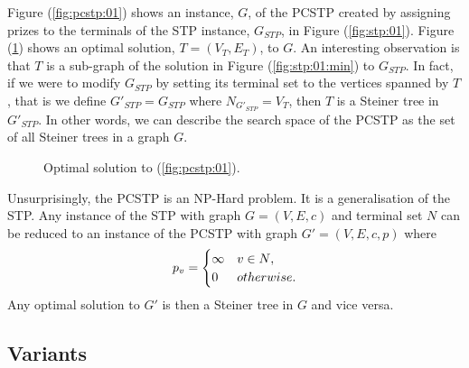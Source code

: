 Figure (\ref{fig:pcstp:01}) shows an instance, $G$, of the PCSTP created by assigning prizes to the terminals of the STP instance, $G_{STP}$, in Figure (\ref{fig:stp:01}).
Figure (\ref{fig:pcstp:01:opt})
shows an optimal solution, $T = (V_T, E_T)$, to $G$. An interesting observation is that
$T$ is a sub-graph of the solution in Figure (\ref{fig:stp:01:min}) to $G_{STP}$.
In fact, if we were to modify $G_{STP}$ by setting its terminal set to the vertices spanned
by $T$, that is we define $G'_{STP} =  G_{STP}$ where  $N_{G'_{STP}} = V_T$, then $T$ is a Steiner
tree in $G'_{STP}$. In other words, we can describe the search space of the PCSTP
 as the set of all Steiner trees in a graph $G$.

\begin{figure}[h]\centering
{}
\caption{Optimal solution to (\ref{fig:pcstp:01})\textnormal{.}}
\label{fig:pcstp:01:opt}
\end{figure}

Unsurprisingly, the PCSTP is an NP-Hard problem. It is a generalisation of the STP. Any instance of
the STP with graph $G = (V, E, c)$ and terminal set $N$ can be reduced to an instance of the PCSTP
with graph $G' = (V, E, c, p)$ where
$$p_v =
\begin{cases}
  \infty & v \in N\mathnormal{,} \\
  0 & \mathnormal{otherwise.}
\end{cases}$$
Any optimal solution to $G'$ is then a Steiner tree in $G$ and vice versa.

\subsection{Variants}

